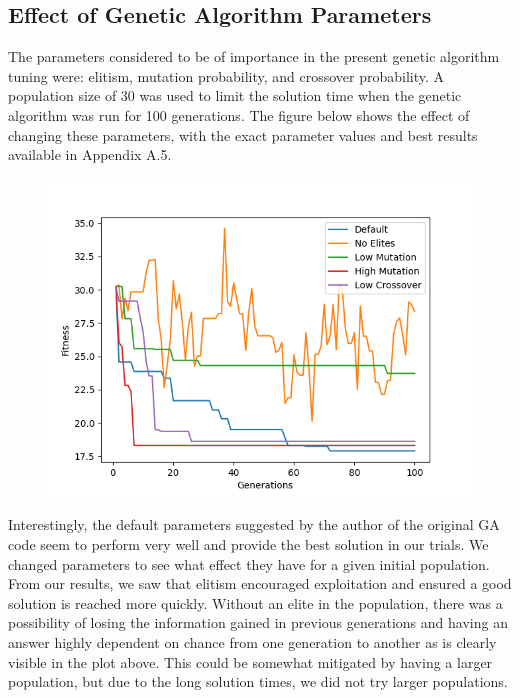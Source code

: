 \documentclass[12pt]{article}
\begin{document}
\subsection{Effect of Genetic Algorithm Parameters}
The parameters considered to be of importance in the present genetic algorithm tuning were: elitism, mutation probability, and crossover probability. A population size of 30 was used to limit the solution time when the genetic algorithm was run for 100 generations. The figure below shows the effect of changing these parameters, with the exact parameter values and best results available in Appendix A.5.
\begin{figure}[h]                   
      \begin{center}                  
          \includegraphics[scale=0.45]{figures/GA_diff_params.png}    
      \end{center}                                                                             
\end{figure}
Interestingly, the default parameters suggested by the author of the original GA code seem to perform very well and provide the best solution in our trials. We changed parameters to see what effect they have for a given initial population. From our results, we saw that elitism encouraged exploitation and ensured a good solution is reached more quickly. Without an elite in the population, there was a possibility of losing the information gained in previous generations and having an answer highly dependent on chance from one generation to another as is clearly visible in the plot above. This could be somewhat mitigated by having a larger population, but due to the long solution times, we did not try larger populations.
\end{document}
